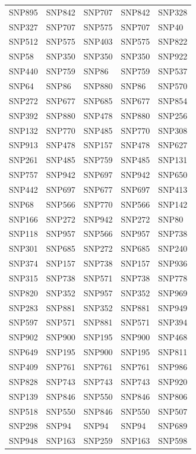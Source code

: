 \begin{table}[ht]
\begin{tabular}{lllll}
  SNP895 & SNP842 & SNP707 & SNP842 & SNP328 \\ 
  SNP327 & SNP707 & SNP575 & SNP707 & SNP40 \\ 
  SNP512 & SNP575 & SNP403 & SNP575 & SNP822 \\ 
  SNP58 & SNP350 & SNP350 & SNP350 & SNP922 \\ 
  SNP440 & SNP759 & SNP86 & SNP759 & SNP537 \\ 
  SNP64 & SNP86 & SNP880 & SNP86 & SNP570 \\ 
  SNP272 & SNP677 & SNP685 & SNP677 & SNP854 \\ 
  SNP392 & SNP880 & SNP478 & SNP880 & SNP256 \\ 
  SNP132 & SNP770 & SNP485 & SNP770 & SNP308 \\ 
  SNP913 & SNP478 & SNP157 & SNP478 & SNP627 \\ 
  SNP261 & SNP485 & SNP759 & SNP485 & SNP131 \\ 
  SNP757 & SNP942 & SNP697 & SNP942 & SNP650 \\ 
  SNP442 & SNP697 & SNP677 & SNP697 & SNP413 \\ 
  SNP68 & SNP566 & SNP770 & SNP566 & SNP142 \\ 
  SNP166 & SNP272 & SNP942 & SNP272 & SNP80 \\ 
  SNP118 & SNP957 & SNP566 & SNP957 & SNP738 \\ 
  SNP301 & SNP685 & SNP272 & SNP685 & SNP240 \\ 
  SNP374 & SNP157 & SNP738 & SNP157 & SNP936 \\ 
  SNP315 & SNP738 & SNP571 & SNP738 & SNP778 \\ 
  SNP820 & SNP352 & SNP957 & SNP352 & SNP969 \\ 
  SNP283 & SNP881 & SNP352 & SNP881 & SNP949 \\ 
  SNP597 & SNP571 & SNP881 & SNP571 & SNP394 \\ 
  SNP902 & SNP900 & SNP195 & SNP900 & SNP468 \\ 
  SNP649 & SNP195 & SNP900 & SNP195 & SNP811 \\ 
  SNP409 & SNP761 & SNP761 & SNP761 & SNP986 \\ 
  SNP828 & SNP743 & SNP743 & SNP743 & SNP920 \\ 
  SNP139 & SNP846 & SNP550 & SNP846 & SNP806 \\ 
  SNP518 & SNP550 & SNP846 & SNP550 & SNP507 \\ 
  SNP298 & SNP94 & SNP94 & SNP94 & SNP689 \\ 
  SNP948 & SNP163 & SNP259 & SNP163 & SNP598 \\ 

\end{tabular}
\end{table}
